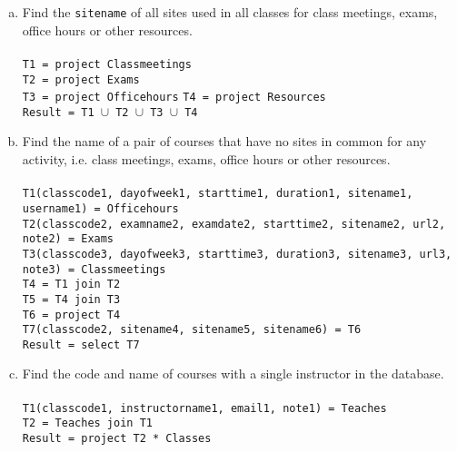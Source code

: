 \documentclass[11pt]{article}
\begin{document}
\begin{enumerate}  [(a)]
\item Find the {\tt sitename} of all sites used in all classes for
  class meetings, exams, office hours or other resources.\\\\
\texttt{T1 = project Classmeetings} \\
\texttt{T2 = project Exams} \\
\texttt{T3 = project Officehours} 
\texttt{T4 = project Resources} \\
\texttt{Result = T1 $\cup$ T2 $\cup$ T3 $\cup$ T4}


\item Find the name of a pair of courses that have no sites in common
  for any activity, i.e. class meetings, exams, office hours or other
  resources. \\\\
 \texttt{T1(classcode1, dayofweek1, starttime1, duration1, sitename1, username1) = Officehours} \\
 \texttt{T2(classcode2, examname2, examdate2, starttime2, sitename2, url2, note2) = Exams} \\
 \texttt{T3(classcode3, dayofweek3, starttime3, duration3, sitename3, url3, note3) = Classmeetings} \\
 \texttt{T4 = T1 join T2}  \\
 \texttt{T5 = T4 join T3}  \\
 \texttt{T6 = project T4} \\
 \texttt{T7(classcode2, sitename4, sitename5, sitename6) = T6} \\ 
 \texttt{Result = select T7}
 
\item Find the code and name of courses with a single instructor in
  the database. \\\\
\texttt{T1(classcode1, instructorname1, email1, note1) = Teaches} \\
\texttt{T2 = Teaches join T1} \\
\texttt{Result = project T2 * Classes } \\


\end{enumerate}
\end{document}
